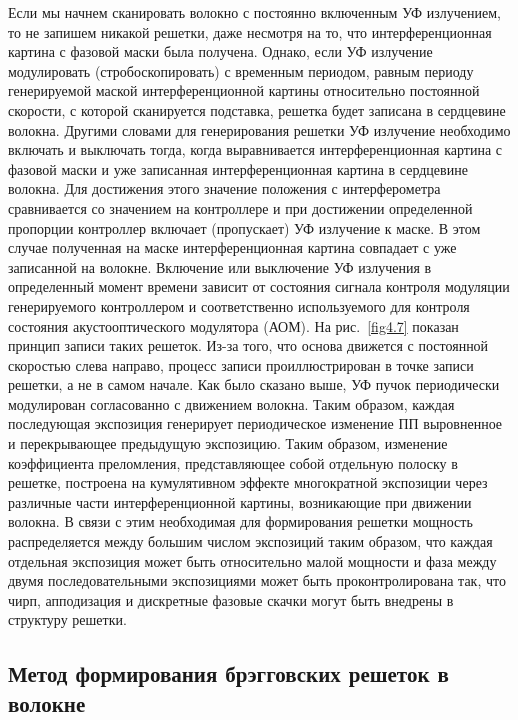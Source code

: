 Если мы начнем сканировать волокно с постоянно включенным УФ излучением, то не запишем никакой решетки, даже несмотря на то, что интерференционная картина с фазовой маски была получена. Однако, если УФ излучение модулировать (стробоскопировать) с временным периодом, равным периоду генерируемой  маской интерференционной картины относительно постоянной скорости, с которой сканируется подставка, решетка будет записана в сердцевине волокна. Другими словами для генерирования решетки УФ излучение необходимо включать и выключать тогда, когда выравнивается интерференционная картина с фазовой маски и уже записанная интерференционная картина в сердцевине волокна. Для достижения этого значение положения с интерферометра сравнивается со значением на контроллере и при достижении определенной пропорции контроллер включает (пропускает) УФ излучение к маске. В этом случае полученная на маске интерференционная картина совпадает с уже записанной на волокне. Включение или выключение УФ излучения в определенный момент времени зависит от состояния сигнала контроля модуляции генерируемого контроллером и соответственно используемого для контроля состояния акустооптического модулятора (АОМ). На рис.~\ref{fig4.7}  показан принцип записи таких решеток. Из-за того, что основа движется с постоянной скоростью слева направо, процесс записи проиллюстрирован в точке записи решетки, а не в самом начале. Как было сказано выше, УФ пучок периодически модулирован согласованно с движением волокна. Таким образом, каждая последующая экспозиция генерирует периодическое изменение ПП выровненное и перекрывающее предыдущую экспозицию. Таким образом, изменение коэффициента преломления, представляющее собой отдельную полоску в решетке, построена на кумулятивном эффекте многократной экспозиции через различные части интерференционной картины, возникающие при движении волокна. В связи с этим необходимая для формирования решетки мощность распределяется между большим числом экспозиций таким образом, что каждая отдельная экспозиция может быть относительно малой мощности и фаза между двумя последовательными экспозициями может быть проконтролирована так, что чирп, апподизация и дискретные фазовые скачки могут быть внедрены в структуру решетки.


\subsection{Метод формирования брэгговских решеток в волокне}


